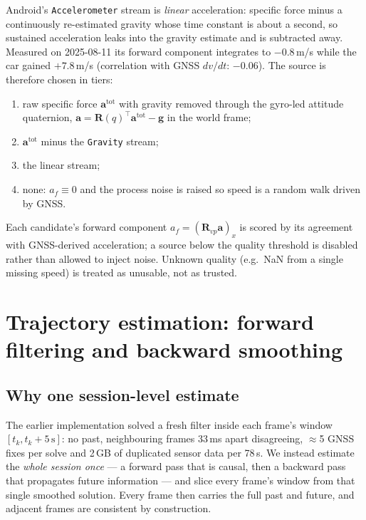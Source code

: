 \documentclass[10pt,a4paper]{article}
\begin{document}
Android's \texttt{Accelerometer} stream is \emph{linear} acceleration: specific force minus a continuously
re-estimated gravity whose time constant is about a second, so sustained acceleration leaks into the
gravity estimate and is subtracted away. Measured on 2025-08-11 its forward component integrates to
$-0.8$\,m/s while the car gained $+7.8$\,m/s (correlation with GNSS $dv/dt$: $-0.06$). The source is
therefore chosen in tiers:
\begin{enumerate}
\item raw specific force $\bm a^\text{tot}$ with gravity removed through the gyro-led attitude quaternion,
  $\bm a = \mathbf{R}(q)^{\!\top}\bm a^\text{tot} - \bm g$ in the world frame;
\item $\bm a^\text{tot}$ minus the \texttt{Gravity} stream;
\item the linear stream;
\item none: $a_f \equiv 0$ and the process noise is raised so speed is a random walk driven by GNSS.
\end{enumerate}
Each candidate's forward component $a_f = (\mathbf{R}_{vp}\bm a)_x$ is scored by its agreement with
GNSS-derived acceleration; a source below the quality threshold is disabled rather than allowed to inject
noise. Unknown quality (e.g.\ NaN from a single missing speed) is treated as unusable, not as trusted.

\section{Trajectory estimation: forward filtering and backward smoothing}
\label{sec:ekf}

\subsection{Why one session-level estimate}
The earlier implementation solved a fresh filter inside each frame's window $[t_k, t_k+5\,\text{s}]$: no
past, neighbouring frames 33\,ms apart disagreeing, $\approx$5 GNSS fixes per solve and 2\,GB of duplicated
sensor data per 78\,s. We instead estimate the \emph{whole session once} --- a forward pass that is causal,
then a backward pass that propagates future information --- and slice every frame's window from that single
smoothed solution. Every frame then carries the full past and future, and adjacent frames are consistent
by construction.
\end{document}

